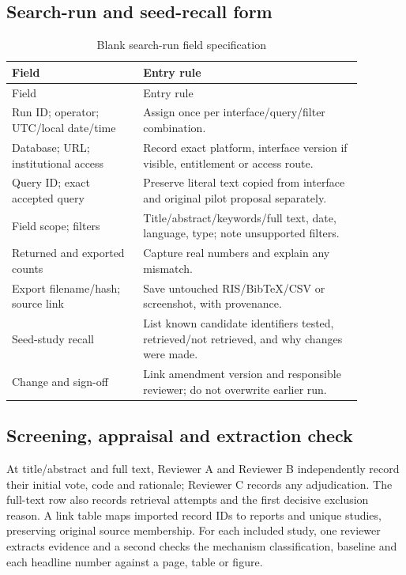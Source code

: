\documentclass[12pt,a4paper]{article}
\begin{document}
\subsection{Search-run and seed-recall form}
\begin{longtable}{p{0.33\linewidth}p{0.55\linewidth}}
\caption{Blank search-run field specification}\\\toprule Field & Entry rule\\\midrule\endfirsthead\toprule Field & Entry rule\\\midrule\endhead
Run ID; operator; UTC/local date/time & Assign once per interface/query/filter combination.\\
Database; URL; institutional access & Record exact platform, interface version if visible, entitlement or access route.\\
Query ID; exact accepted query & Preserve literal text copied from interface and original pilot proposal separately.\\
Field scope; filters & Title/abstract/keywords/full text, date, language, type; note unsupported filters.\\
Returned and exported counts & Capture real numbers and explain any mismatch.\\
Export filename/hash; source link & Save untouched RIS/BibTeX/CSV or screenshot, with provenance.\\
Seed-study recall & List known candidate identifiers tested, retrieved/not retrieved, and why changes were made.\\
Change and sign-off & Link amendment version and responsible reviewer; do not overwrite earlier run.\\\bottomrule
\end{longtable}

\subsection{Screening, appraisal and extraction check}
At title/abstract and full text, Reviewer A and Reviewer B independently record their initial vote, code and rationale; Reviewer C records any adjudication. The full-text row also records retrieval attempts and the first decisive exclusion reason. A link table maps imported record IDs to reports and unique studies, preserving original source membership. For each included study, one reviewer extracts evidence and a second checks the mechanism classification, baseline and each headline number against a page, table or figure.
\end{document}
